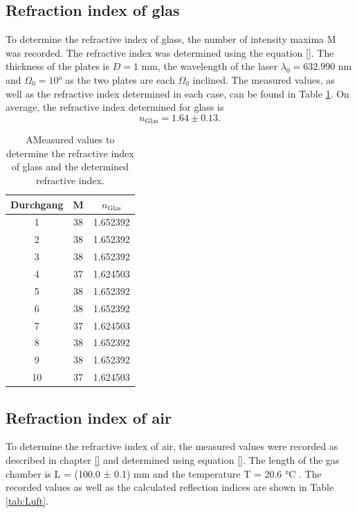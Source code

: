 \subsection{Refraction index of glas}
\label{sec:glas}

To determine the refractive index of glass, the number of intensity maxima M was recorded.
The refractive index was determined using the equation \eqref{}. 
The thickness of the plates is $D = 1$ mm, the wavelength of the laser  $\lambda_0 = 632.990$ nm and $\Omega_0 = 10°$ as the two plates are each $\Omega_0$ inclined.
The measured values, as well as the refractive index determined in each case, can be found in Table \ref{tab:Glas}.
On average, the refractive index determined for glass is
\begin{equation*}
  n_{\text{Glas}} = 1.64 \pm 0.13.
\end{equation*}

\begin{table}[H]
  \centering
  \caption{AMeasured values to determine the refractive index of glass and the determined refractive index.}
  \label{tab:Glas}
  \begin{tabular}{c c c}
    \toprule
    Durchgang & M & $n_\text{Glas}$ \\
    \midrule
    1    &  38  & 1.652392 \\
    2    &  38  & 1.652392 \\   
    3    &  38  & 1.652392 \\   
    4    &  37  & 1.624503 \\   
    5    &  38  & 1.652392 \\   
    6    &  38  & 1.652392 \\   
    7    &  37  & 1.624503 \\   
    8    &  38  & 1.652392 \\   
    9    &  38  & 1.652392 \\   
    10   &  37  & 1.624503 \\   
    \bottomrule
  \end{tabular}
\end{table}


\subsection{Refraction index of air}
\label{sec:air}

To determine the refractive index of air, the measured values were recorded as described in chapter \ref{} and determined using equation \ref{}.
The length of the gas chamber is L = (100.0 ± 0.1) mm and the temperature T = 20.6 °C .
The recorded values as well as the calculated reflection indices are shown in Table \ref{tab:Luft}.

